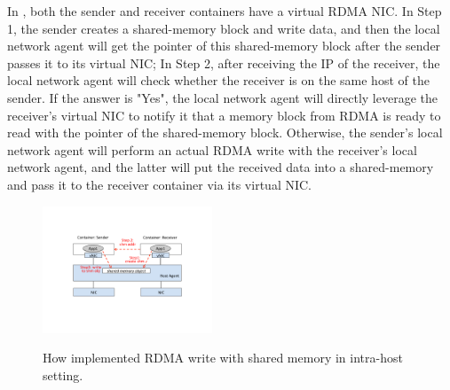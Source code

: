 In \sysname, both the sender and receiver containers have a virtual RDMA NIC.
In Step 1, the sender creates a shared-memory block and write data, and then 
the local network agent will get the pointer of this shared-memory block after the sender passes it to its virtual NIC; In Step 2, after receiving the IP of 
the receiver, the local network agent will check whether the receiver is on
the same host of the sender. If the answer is "Yes", the local network agent will
directly leverage the receiver's virtual NIC to notify it that a memory block 
from RDMA is ready to read with the pointer of the shared-memory block. 
Otherwise, the sender's local network agent will perform an actual RDMA write
with the receiver's local network agent, and the latter will put the received data into a shared-memory and pass it to the receiver container via its virtual NIC.
     
     \begin{figure}[ht]
     \centering 
     \includegraphics[width=0.45\textwidth]{figures/system/sys_rdma_shm.pdf}      
     \label{fig:sys_rdma_shm}
     \caption{How \sysname implemented RDMA write with shared memory in intra-host setting.} 
     \end{figure}
     


\iffalse

